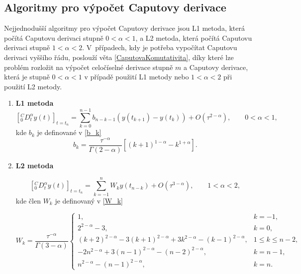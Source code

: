 \documentclass[a4paper,12pt,twoside]{article}
\theoremstyle{definition}
\theoremstyle{remark}
\numberwithin{equation}{section}
\numberwithin{table}{section}
\numberwithin{figure}{section}
\begin{document}
\subsection{Algoritmy pro výpočet Caputovy derivace}
Nejjednodušší algoritmy pro výpočet Caputovy derivace jsou L1 metoda, která počítá Caputovu derivaci stupně $0<\alpha<1$, a L2 metoda, která počítá Caputovu derivaci stupně $1<\alpha<2$. V~případech, kdy je potřeba vypočítat Caputovu derivaci vyššího řádu, poslouží věta \ref{CaputovaKomutativita}, díky které lze problém rozložit na výpočet celočíselné derivace stupně $m$ a Caputovy derivace, která je stupně $0<\alpha<1$ v případě použití L1 metody nebo  $1<\alpha<2$ při použití L2 metody.

\begin{enumerate}[label=(\textbf{\arabic*})]
	\item \textbf{L1 metoda}
\begin{equation}
		\left[^{C}_{0}D^{\alpha}_{t} y\left(t\right)\right]_{t=t_{n}} = \sum_{k=0}^{n-1} b_{n-k-1}\left(y\left(t_{k+1}\right) - y\left(t_{k}\right)\right) +O\left(\tau^{2-\alpha}\right), \qquad 0<\alpha<1,
\end{equation}
kde $b_k$ je definované v \eqref{b_k}
\begin{equation} \label{b_k}
	b_{k} =  \frac{\tau^{-\alpha}}{\Gamma \left( 2-\alpha \right) } \left[\left(k+1\right)^{1-\alpha} - k^{1+\alpha}\right].
\end{equation}

	\item \textbf{L2 metoda}
	
	\begin{equation}
		\left[ ^{C}_{0}D^{\alpha}_{t} y\left(t\right)\right]_{t=t_{n}} = \sum_{k=-1}^{n} W_{k} y\left(t_{n-k}\right) + O\left(\tau^{3-\alpha}\right), \qquad1<\alpha<2,
	\end{equation}
kde člen $W_{k}$ je definovaný v \eqref{W_k}

\begin{equation} \label{W_k}
	W_{k} = \frac{\tau^{-\alpha}}{\Gamma\left(3-\alpha\right)}
	\begin{cases}
		1, &  k = -1,\\
		2^{2-\alpha} - 3, & k=0, \\
		\left(k+2\right)^{2-\alpha} - 3\left(k+1\right)^{2-\alpha} + 3k^{2-\alpha} - \left(k-1\right)^{2-\alpha}, & 1\leq k \leq n-2, \\
		-2n^{2-\alpha} + 3\left(n-1\right)^{2-\alpha} - \left(n-2\right)^{2-\alpha},  & k = n-1,\\
		n^{2-\alpha} - \left(n-1\right) ^{2-\alpha}, & k=n.	
	\end{cases}
\end{equation}

\end{enumerate}
\end{document}

